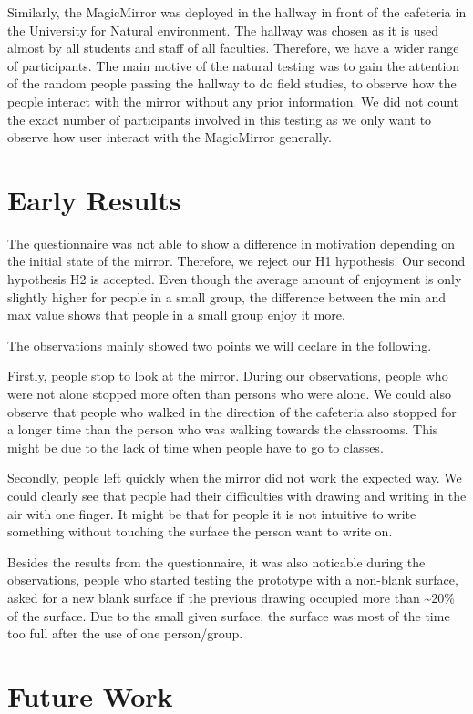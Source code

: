\documentclass{sigchi-ext}
\begin{document}
Similarly, the MagicMirror was deployed in the hallway in front of the cafeteria in the University for Natural environment. The hallway was chosen as it is used almost by all students and staff of all faculties. Therefore, we have a wider range of participants. The main motive of the natural testing was to gain the attention of the random people passing the hallway to do field studies, to observe how the people interact with the mirror without any prior information. We did not count the exact number of participants involved in this testing as we only want to observe how user interact with the MagicMirror generally.

\section{Early Results}
The questionnaire was not able to show a difference in motivation depending on the initial state of the mirror. Therefore, we reject our H1 hypothesis. Our second hypothesis H2 is accepted. Even though the average amount of enjoyment is only slightly higher for people in a small group, the difference between the min and max value shows that people in a small group enjoy it more.

The observations mainly showed two points we will declare in the following. 

 Firstly, people stop to look at the mirror. During our observations, people who were not alone stopped more often than persons who were alone. We could also observe that people who walked in the direction of the cafeteria also stopped for a longer time than the person who was walking towards the classrooms. This might be due to the lack of time when people have to go to classes.

Secondly, people left quickly when the mirror did not work the expected way. We could clearly see that people had their difficulties with drawing and writing in the air with one finger. It might be that for people it is not intuitive to write something without touching the surface the person want to write on.

Besides the results from the questionnaire, it was also noticable during the observations, people who started testing the prototype with a non-blank surface, asked for a new blank surface if the previous drawing occupied more than \textasciitilde20\% of the surface. Due to the small given surface, the surface was most of the time too full after the use of one person/group.

\section{Future Work}

\end{document}
